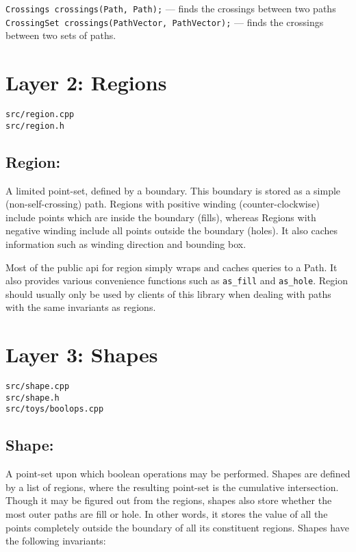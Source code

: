 \documentclass[openany]{book}
\begin{document}
\verb|Crossings crossings(Path, Path);|  —  finds the crossings between two paths
\verb|CrossingSet crossings(PathVector, PathVector);|  —  finds the crossings between two sets of paths.


\section{Layer 2: Regions}

\begin{verbatim}
src/region.cpp
src/region.h
\end{verbatim}

\subsection{Region:}
A limited point-set, defined by a boundary. This boundary is stored as a simple (non-self-crossing) path. Regions with positive winding (counter-clockwise) include points which are inside the boundary (fills), whereas Regions with negative winding include all points outside the boundary (holes). It also caches information such as winding direction and bounding box.

Most of the public api for region simply wraps and caches queries to a Path. It also provides various convenience functions such as \verb|as_fill| and \verb|as_hole|. Region should usually only be used by clients of this library when dealing with paths with the same invariants as regions.


\section{Layer 3: Shapes}

\begin{verbatim}
src/shape.cpp
src/shape.h
src/toys/boolops.cpp
\end{verbatim}

\subsection{Shape:}
A point-set upon which boolean operations may be performed. Shapes are defined by a list of regions, where the resulting point-set is the cumulative intersection. Though it may be figured out from the regions, shapes also store whether the most outer paths are fill or hole. In other words, it stores the value of all the points completely outside the boundary of all its constituent regions. Shapes have the following invariants:
\end{document}
